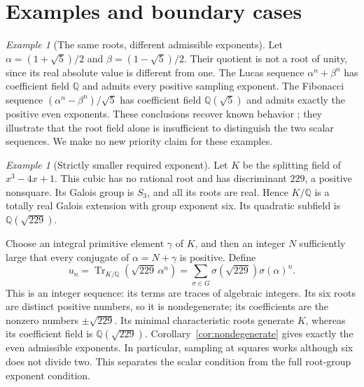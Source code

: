 \documentclass[11pt]{article}
\theoremstyle{definition}
\theoremstyle{remark}
\newtheorem{example}[theorem]{Example}
\newcommand{\Q}{\mathbb Q}
\begin{document}
\section{Examples and boundary cases}
\begin{example}[The same roots, different admissible exponents]
Let $\alpha=(1+\sqrt5)/2$ and $\beta=(1-\sqrt5)/2$. Their quotient is not a root of unity, since its real absolute value is different from one. The Lucas sequence $\alpha^n+\beta^n$ has coefficient field $\Q$ and admits every positive sampling exponent. The Fibonacci sequence $(\alpha^n-\beta^n)/\sqrt5$ has coefficient field $\Q(\sqrt5)$ and admits exactly the positive even exponents. These conclusions recover known behavior \cite{LW}; they illustrate that the root field alone is insufficient to distinguish the two scalar sequences. We make no new priority claim for these examples.
\end{example}

\begin{example}[Strictly smaller required exponent]\label{ex:symmetric}
Let $K$ be the splitting field of $x^3-4x+1$. This cubic has no rational root and has discriminant $229$, a positive nonsquare. Its Galois group is $S_3$, and all its roots are real. Hence $K/\Q$ is a totally real Galois extension with group exponent six. Its quadratic subfield is $\Q(\sqrt{229})$.

Choose an integral primitive element $\gamma$ of $K$, and then an integer $N$ sufficiently large that every conjugate of $\alpha=N+\gamma$ is positive. Define
\[
 u_n=\operatorname{Tr}_{K/\Q}(\sqrt{229}\,\alpha^n)
     =\sum_{\sigma\in G}\sigma(\sqrt{229})\sigma(\alpha)^n.
\]
This is an integer sequence: its terms are traces of algebraic integers. Its six roots are distinct positive numbers, so it is nondegenerate; its coefficients are the nonzero numbers $\pm\sqrt{229}$. Its minimal characteristic roots generate $K$, whereas its coefficient field is $\Q(\sqrt{229})$. Corollary~\ref{cor:nondegenerate} gives exactly the even admissible exponents. In particular, sampling at squares works although six does not divide two. This separates the scalar condition from the full root-group exponent condition.
\end{example}
\end{document}
